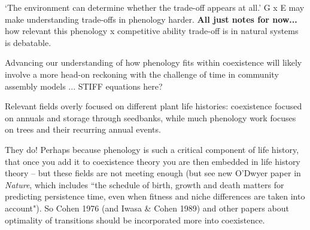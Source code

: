 \documentclass[11pt]{article}
\begin{document}
  


`The environment can determine whether the trade-off appears at all.' G x E may make understanding trade-offs in phenology harder. 
{\bf All just notes for now...}
 how relevant this phenology x competitive ability  trade-off is in natural systems is debatable. 
 
 Advancing our understanding of how phenology fits within coexistence will likely involve a more head-on reckoning with the challenge of time in community assembly models ... STIFF equations here? 


Relevant fields overly focused on different plant life histories: coexistence focused on annuals and storage through seedbanks, while much phenology work focuses on trees and their recurring annual events. 

They do! Perhaps because phenology is such a critical component of life history, that once you add it to coexistence theory you are then embedded in life history theory -- but these fields are not meeting enough (but see new O'Dwyer paper in \emph{Nature}, which includes ``the schedule of birth, growth and death matters for predicting persistence time, even when fitness and niche differences are taken into account"). So Cohen 1976 (and Iwasa \& Cohen 1989) and other papers about optimality of transitions should be incorporated more into coexistence. 
\end{document}
